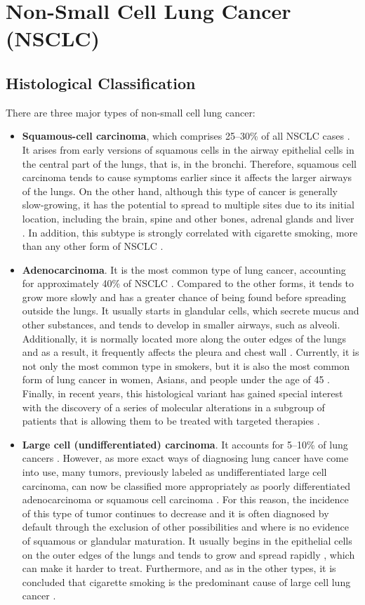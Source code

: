 \section{Non-Small Cell Lung Cancer (NSCLC)}

\subsection{Histological Classification}

There are three major types of non-small cell lung cancer:
\begin{itemize}
    \item \textbf{Squamous-cell carcinoma}, which comprises 25–30\% of all NSCLC cases \cite{NSCLC}. It arises from early versions of squamous cells in the airway epithelial cells in the central part of the lungs, that is, in the bronchi. Therefore, squamous cell carcinoma tends to cause symptoms earlier since it affects the larger airways of the lungs. On the other hand, although this type of cancer is generally slow-growing, it has the potential to spread to multiple sites due to its initial location, including the brain, spine and other bones, adrenal glands and liver \cite{NSCLC_metastases}. In addition, this subtype is strongly correlated with cigarette smoking, more than any other form of NSCLC \cite{Tobacco, Smoking}.
    \item \textbf{Adenocarcinoma}. It is the most common type of lung cancer, accounting for approximately 40\% of NSCLC \cite{NSCLC}. Compared to the other forms, it tends to grow more slowly and has a greater chance of being found before spreading outside the lungs. It usually starts in glandular cells, which secrete mucus and other substances, and tends to develop in smaller airways, such as alveoli. Additionally, it is normally located more along the outer edges of the lungs and as a result, it frequently affects the pleura and chest wall \cite{ALA}. Currently, it is not only the most common type in smokers, but it is also the most common form of lung cancer in women, Asians, and people under the age of 45 \cite{AD_survival}. Finally, in recent years, this histological variant has gained special interest with the discovery of a series of molecular alterations in a subgroup of patients that is allowing them to be treated with targeted therapies \cite{AD_savini}.
    \item \textbf{Large cell (undifferentiated) carcinoma}. It accounts for 5–10\% of lung cancers \cite{NSCLC}. However, as more exact ways of diagnosing lung cancer have come into use, many tumors, previously labeled as undifferentiated large cell carcinoma, can now be classified more appropriately as poorly differentiated adenocarcinoma or squamous cell carcinoma \cite{LCC}. For this reason, the incidence of this type of tumor continues to decrease and it is often diagnosed by default through the exclusion of other possibilities and where is no evidence of squamous or glandular maturation. It usually begins in the epithelial cells on the outer edges of the lungs and tends to grow and spread rapidly \cite{LCC_bio}, which can make it harder to treat. Furthermore, and as in the other types, it is concluded that cigarette smoking is the predominant cause of large cell lung cancer \cite{LCC_smoking}.

\end{itemize}
